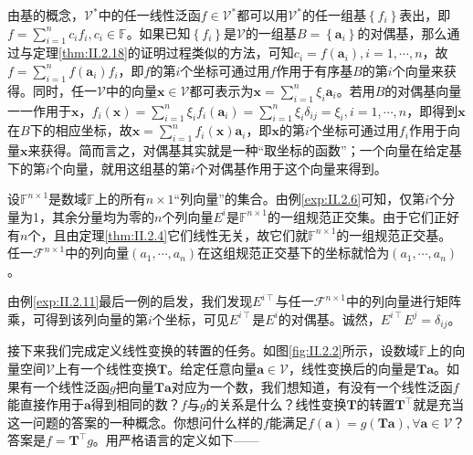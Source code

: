 \documentclass[main.tex]{subfiles}
\begin{document}
由基的概念，$\mathcal{V}^*$中的任一线性泛函$f\in\mathcal{V}^*$都可以用$\mathcal{V}^*$的任一组基$\left\{f_i\right\}$表出，即$f=\sum_{i=1}^nc_if_i,c_i\in\mathbb{F}$。如果已知$\left\{f_i\right\}$是$\mathcal{V}$的一组基$B=\left\{\mathbf{a}_i\right\}$的对偶基，那么通过与定理\ref{thm:II.2.18}的证明过程类似的方法，可知$c_i=f\left(\mathbf{a}_i\right),i=1,\cdots,n$，故$f=\sum_{i=1}^nf\left(\mathbf{a}_i\right)f_i$，即$f$的第$i$个坐标可通过用$f$作用于有序基$B$的第$i$个向量来获得。同时，任一$\mathcal{V}$中的向量$\mathbf{x}\in\mathcal{V}$都可表示为$\mathbf{x}=\sum_{i=1}^n\xi_i\mathbf{a}_i$。若用$B$的对偶基向量一一作用于$\mathbf{x}$，$f_i\left(\mathbf{x}\right)=\sum_{i=1}^n\xi_if_i\left(\mathbf{a}_i\right)=\sum_{i=1}^n\xi_i\delta_{ij}=\xi_i,i=1,\cdots,n$，即得到$\mathbf{x}$在$B$下的相应坐标，故$\mathbf{x}=\sum_{i=1}^nf_i\left(\mathbf{x}\right)\mathbf{a}_i$，即$\mathbf{x}$的第$i$个坐标可通过用$f_i$作用于向量$\mathbf{x}$来获得。简而言之，对偶基其实就是一种“取坐标的函数”；一个向量在给定基下的第$i$个向量，就用这组基的第$i$个对偶基作用于这个向量来得到。

\begin{example}
    设$\mathbb{F}^{n\times 1}$是数域$\mathbb{F}$上的所有$n\times 1 $“列向量”的集合。由例\ref{exp:II.2.6}可知，仅第$i$个分量为1，其余分量均为零的$n$个列向量$E^i$是$\mathbb{F}^{n\times 1}$的一组规范正交集。由于它们正好有$n$个，且由定理\ref{thm:II.2.4}它们线性无关，故它们就$\mathbb{F}^{n\times 1}$的一组规范正交基。    任一$\mathcal{F}^{n\times 1}$中的列向量$\left(a_1,\cdots,a_n\right)$在这组规范正交基下的坐标就恰为$\left(a_1,\cdots,a_n\right)$。

    由例\ref{exp:II.2.11}最后一例的启发，我们发现$E^{i\intercal}$与任一$\mathcal{F}^{n\times 1}$中的列向量进行矩阵乘，可得到该列向量的第$i$个坐标，可见$E^{i\intercal}$是$E^i$的对偶基。诚然，$E^{i\intercal}E^j=\delta_{ij}$。
\end{example}

接下来我们完成定义线性变换的转置的任务。如图\ref{fig:II.2.2}所示，设数域$\mathbb{F}$上的向量空间$\mathcal{V}$上有一个线性变换$\mathbf{T}$。给定任意向量$\mathbf{a}\in\mathcal{V}$，线性变换后的向量是$\mathbf{Ta}$。如果有一个线性泛函$g$把向量$\mathbf{Ta}$对应为一个数，我们想知道，有没有一个线性泛函$f$能直接作用于$\mathbf{a}$得到相同的数？$f$与$g$的关系是什么？线性变换$\mathbf{T}$的转置$\mathbf{T}^\intercal$就是充当这一问题的答案的一种概念。你想问什么样的$f$能满足$f\left(\mathbf{a}\right)=g\left(\mathbf{Ta}\right),\forall\mathbf{a}\in\mathcal{V}$？答案是$f=\mathbf{T}^\intercal g$。用严格语言的定义如下——
\end{document}
